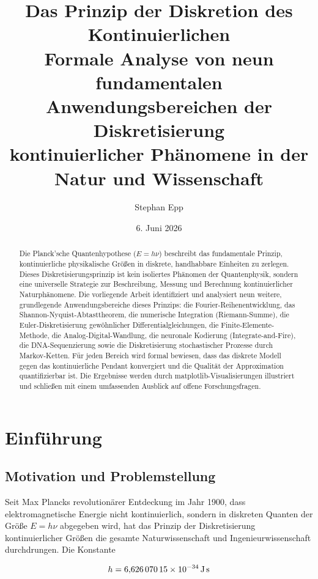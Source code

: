 ﻿\documentclass[a4paper,12pt]{article}
\title{\textbf{Das Prinzip der Diskretion des Kontinuierlichen}\\[0.5em]
\large Formale Analyse von neun fundamentalen Anwendungsbereichen der Diskretisierung\\
kontinuierlicher Phänomene in der Natur und Wissenschaft}
\author{Stephan Epp}
\date{6. Juni 2026}
\theoremstyle{definition}
\begin{document}
\maketitle

\begin{abstract}
\noindent
Die Planck'sche Quantenhypothese ($E = h\nu$) beschreibt das fundamentale Prinzip, kontinuierliche physikalische Größen in diskrete, handhabbare Einheiten zu zerlegen. Dieses Diskretisierungsprinzip ist kein isoliertes Phänomen der Quantenphysik, sondern eine universelle Strategie zur Beschreibung, Messung und Berechnung kontinuierlicher Natur\-phänomene. Die vorliegende Arbeit identifiziert und analysiert neun weitere, grundlegende Anwendungsbereiche dieses Prinzips: die Fourier-Reihenentwicklung, das Shannon-Nyquist-Abtasttheorem, die numerische Integration (Riemann-Summe), die Euler-Diskretisierung gewöhnlicher Differentialgleichungen, die Finite-Elemente-Methode, die Analog-Digital-Wandlung, die neuronale Kodierung (Integrate-and-Fire), die DNA-Sequenzierung sowie die Diskretisierung stochastischer Prozesse durch Markov-Ketten. Für jeden Bereich wird formal bewiesen, dass das diskrete Modell gegen das kontinuierliche Pendant konvergiert und die Qualität der Approximation quantifizierbar ist. Die Ergebnisse werden durch matplotlib-Visualisierungen illustriert und schließen mit einem umfassenden Ausblick auf offene Forschungsfragen.
\end{abstract}

\tableofcontents
\newpage

\section{Einführung}

\subsection{Motivation und Problemstellung}

Seit Max Plancks revolutionärer Entdeckung im Jahr 1900, dass elektromagnetische Energie nicht kontinuierlich, sondern in diskreten Quanten der Größe $E = h\nu$ abgegeben wird, hat das Prinzip der Diskretisierung kontinuierlicher Größen die gesamte Naturwissenschaft und Ingenieurwissenschaft durchdrungen. Die Konstante

\[
h = 6{,}626\,070\,15 \times 10^{-34}\,\text{J\,s}
\]
\end{document}
